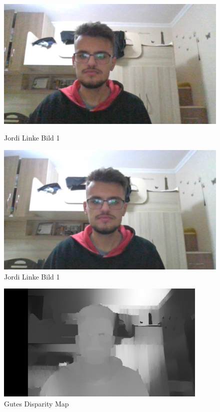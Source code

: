 \begin{figure}[!htb]
   \begin{minipage}{0.48\textwidth}
     \centering
     \includegraphics[width=.9\linewidth]{./figures/jordiL.jpg}
     \caption{Jordi Linke Bild 1}
   \end{minipage}\hfill
   \begin{minipage}{0.48\textwidth}
     \centering
     \includegraphics[width=.9\linewidth]{./figures/jordiR.jpg}
     \caption{Jordi Linke Bild 1}
   \end{minipage}
\end{figure}
\begin{figure}[!htb]
  \centering
    \includegraphics[width=0.9\textwidth]{./figures/dispgood.jpg}
      \caption{Gutes Disparity Map}
\end{figure}\\
